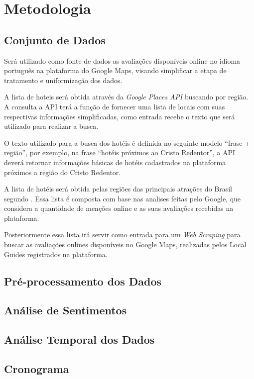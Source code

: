\chapter{Metodologia}
\label{cap:metodologia}

\section{Conjunto de Dados}

Será utilizado como fonte de dados as avaliações disponíveis online no idioma português na plataforma do Google Maps, visando simplificar a etapa de tratamento e uniformização dos dados.

A lista de hoteis será obtida através da \emph{Google Places API} buscando por região. A consulta a API terá a função de fornecer uma lista de locais com suas respectivas informações simplificadas, como entrada recebe o texto que será utilizado para realizar a busca.

O texto utilizado para a busca dos hotéis é definida no seguinte modelo “frase + região”, por exemplo, na frase “hotéis próximos ao Cristo Redentor”, a API deverá retornar informações básicas de hotéis cadastrados na plataforma próximos a região do Cristo Redentor.

A lista de hotéis será obtida pelas regiões das principais atrações do Brasil segundo \cite{googleFlights2022destinos}. Essa lista é composta com base nas analises feitas pelo Google, que considera a quantidade de menções online e as suas avaliações recebidas na plataforma.

Posteriormente essa lista irá servir como entrada para um \emph{Web Scraping} para buscar as avaliações onlines disponíveis no Google Maps, realizadas pelos Local Guides\cite{google2022localguides} registrados na plataforma.

\section{Pré-processamento dos Dados}



\section{Análise de Sentimentos}


\section{Análise Temporal dos Dados}



\section{Cronograma}
